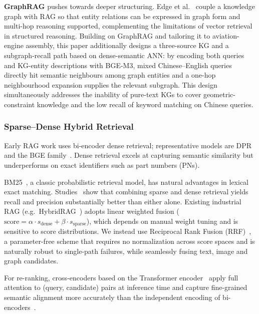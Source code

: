 \documentclass[applsci,article,submit,pdftex,moreauthors]{Definitions/mdpi}
\begin{document}
\textbf{GraphRAG} pushes towards deeper structuring. Edge et al.~\citep{edge2024graphrag} couple a knowledge graph with RAG so that entity relations can be expressed in graph form and multi-hop reasoning supported, complementing the limitations of vector retrieval in structured reasoning. Building on GraphRAG and tailoring it to aviation-engine assembly, this paper additionally designs a three-source KG and a subgraph-recall path based on dense-semantic ANN: by encoding both queries and KG-entity descriptions with BGE-M3, mixed Chinese--English queries directly hit semantic neighbours among graph entities and a one-hop neighbourhood expansion supplies the relevant subgraph. This design simultaneously addresses the inability of pure-text KGs to cover geometric-constraint knowledge and the low recall of keyword matching on Chinese queries.

\subsubsection{Sparse--Dense Hybrid Retrieval}

Early RAG work uses bi-encoder dense retrieval; representative models are DPR~\citep{karpukhin2020dpr} and the BGE family~\citep{bge2023}. Dense retrieval excels at capturing semantic similarity but underperforms on exact identifiers such as part numbers (PNs).

BM25~\citep{robertson2009bm25}, a classic probabilistic retrieval model, has natural advantages in lexical exact matching. Studies~\citep{luan2021sparse} show that combining sparse and dense retrieval yields recall and precision substantially better than either alone. Existing industrial RAG (e.g.\ HybridRAG~\citep{shen2025hybridrag}) adopts linear weighted fusion ($\text{score} = \alpha\cdot s_{\text{dense}} + \beta\cdot s_{\text{sparse}}$), which depends on manual weight tuning and is sensitive to score distributions. We instead use Reciprocal Rank Fusion (RRF)~\citep{cormack2009rrf}, a parameter-free scheme that requires no normalization across score spaces and is naturally robust to single-path failures, while seamlessly fusing text, image and graph candidates.

For re-ranking, cross-encoders based on the Transformer encoder~\citep{vaswani2017attention,devlin2019bert} apply full attention to (query, candidate) pairs at inference time and capture fine-grained semantic alignment more accurately than the independent encoding of bi-encoders~\citep{nogueira2019passage}.
\end{document}
